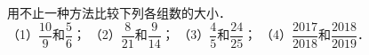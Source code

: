用不止一种方法比较下列各组数的大小．\\
（1）$\dfrac{10}{9}$和$\dfrac{5}{6}$；  \qquad （2）$\dfrac{8}{21}$和$\dfrac{9}{14}$； \qquad
（3）$\dfrac{4}{5}$和$\dfrac{24}{25}$；  \qquad （4）$\dfrac{2017}{2018}$和$\dfrac{2018}{2019}$．